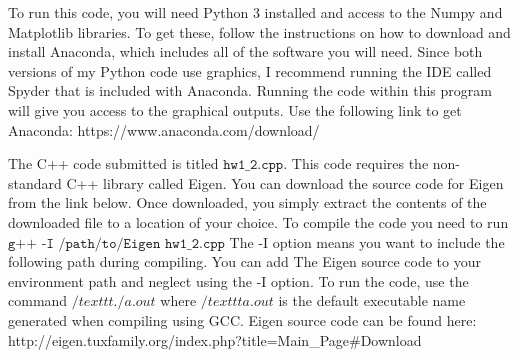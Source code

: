 \documentclass[letterpaper,11pt]{article}
\begin{document}
To run this code, you will need Python 3 installed and access to the Numpy and Matplotlib libraries.  To get these, follow the instructions on how to download and install Anaconda, which includes all of the software you will need.  Since both versions of my Python code use graphics, I recommend running the IDE called Spyder that is included with Anaconda.  Running the code within this program will give you access to the graphical outputs.  Use the following link to get Anaconda: https://www.anaconda.com/download/

The C++ code submitted is titled $\texttt{hw1\_2.cpp}$.  This code requires the non-standard C++ library called Eigen.  You can download the source code for Eigen from the link below.  Once downloaded, you simply extract the contents of the downloaded file to a location of your choice.  To compile the code you need to run $\texttt{g++ -I /path/to/Eigen hw1\_2.cpp}$  The -I option means you want to include the following path during compiling.  You can add The Eigen source code to your environment path and neglect using the -I option.  To run the code, use the command $/texttt{./a.out}$ where $/texttt{a.out}$ is the default executable name generated when compiling using GCC.  Eigen source code can be found here: http://eigen.tuxfamily.org/index.php?title=Main\_Page\#Download
\end{document}
